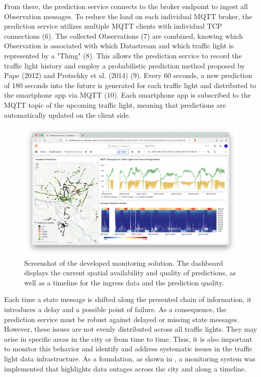 From there, the prediction service connects to the broker endpoint to ingest all Observation messages. To reduce the load on each individual MQTT broker, the prediction service utilizes multiple MQTT clients with individual TCP connections (6). The collected Observations (7) are combined, knowing which Observation is associated with which Datastream and which traffic light is represented by a "Thing" (8). This allows the prediction service to record the traffic light history and employ a probabilistic prediction method proposed by Pape (2012) \cite{pape_untersuchung_2012} and Protschky et al. (2014) \cite{protschky_extensive_2014, protschky_adaptive_2014} (9). Every 60 seconds, a new prediction of 180 seconds into the future is generated for each traffic light and distributed to the smartphone app via MQTT (10). Each smartphone app is subscribed to the MQTT topic of the upcoming traffic light, meaning that predictions are automatically updated on the client side.

\begin{figure}[t]
\centering
\includegraphics[width=\linewidth]{images/monitoring-screenshot.png}
\caption{Screenshot of the developed monitoring solution. The dashboard displays the current spatial availability and quality of predictions, as well as a timeline for the ingress data and the prediction quality.}
\label{fig:monitoring-screenshot}
\end{figure}

Each time a state message is shifted along the presented chain of information, it introduces a delay and a possible point of failure. As a consequence, the prediction service must be robust against delayed or missing state messages. However, these issues are not evenly distributed across all traffic lights. They may arise in specific areas in the city or from time to time. Thus, it is also important to monitor this behavior and identify and address systematic issues in the traffic light data infrastructure. As a foundation, as shown in , a monitoring system was implemented that highlights data outages across the city and along a timeline.

